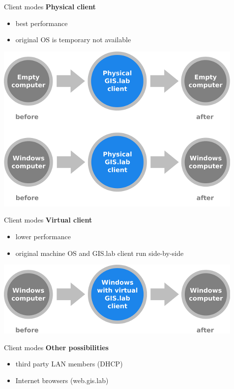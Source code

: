 \documentclass[12pt]{beamer}
\begin{document}
\begin{frame}{Client modes}
	\textbf{Physical client}
	\begin{itemize}
		\item best performance
		\item original OS is temporary not available 
	\end{itemize}
	\begin{center}
		\includegraphics[keepaspectratio=true,height=0.6\textheight]{images/schema-physical-client.png}
	\end{center}
\end{frame}


\begin{frame}{Client modes}
	\textbf{Virtual client}
	\begin{itemize}
		\item lower performance
		\item original machine OS and GIS.lab client run side-by-side
	\end{itemize}
	\begin{center}
		\includegraphics[keepaspectratio=true,height=0.4\textheight]{images/schema-virtual-client.png}
	\end{center}
\end{frame}


\begin{frame}{Client modes}
	\textbf{Other possibilities}
	\begin{itemize}
		\item third party LAN members (DHCP)
		\item Internet browsers (web.gis.lab)
	\end{itemize}
\end{frame}
\end{document}
